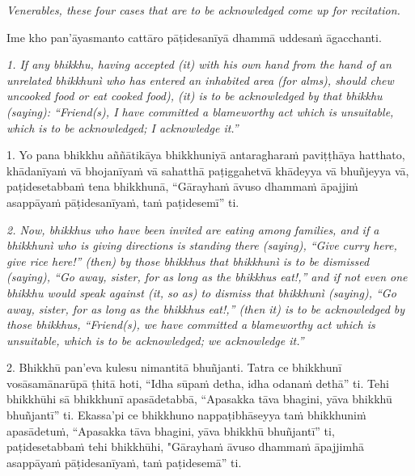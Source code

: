 \documentclass[11pt]{article}
\newcommand{\EnglishColumn}[1]{\itshape\footnotesize{#1}}
\begin{document}
\begin{paracol}{2}
\begin{column}
{\EnglishColumn
Venerables, these four cases that are to be acknowledged come up for recitation.
}
\switchcolumn

\begin{flushleft}
Ime kho pan’āyasmanto cattāro pāṭidesanīyā dhammā uddesaṁ āgacchanti.
\switchcolumn*
\end{flushleft}

{\EnglishColumn
1. If any bhikkhu, having accepted (it) with his own hand from the hand of an unrelated bhikkhunì who has entered an inhabited area (for alms), should chew uncooked food or eat cooked food), (it) is to be acknowledged by that bhikkhu (saying): “Friend(s), I have committed a blameworthy act which is unsuitable, which is to be acknowledged; I acknowledge it.”
}
\switchcolumn

\begin{flushleft}
1. Yo pana bhikkhu aññātikāya bhikkhuniyā antaragharaṁ paviṭṭhāya hatthato, khādanīyaṁ vā bhojanīyaṁ vā sahatthā paṭiggahetvā khādeyya vā bhuñjeyya vā, paṭidesetabbaṁ tena bhikkhunā, “Gārayhaṁ āvuso dhammaṁ āpajjiṁ asappāyaṁ pāṭidesanīyaṁ, taṁ paṭidesemī” ti.
\switchcolumn*
\end{flushleft}

{\EnglishColumn
2. Now, bhikkhus who have been invited are eating among families, and if a bhikkhunì who is giving directions is standing there (saying), “Give curry here, give rice here!” (then) by those bhikkhus that bhikkhunì is to be dismissed (saying), “Go away, sister, for as long as the bhikkhus eat!,” and if not even one bhikkhu would speak against (it, so as) to dismiss that bhikkhunì (saying), “Go away, sister, for as long as the bhikkhus eat!,” (then it) is to be acknowledged by those bhikkhus, “Friend(s), we have committed a blameworthy act which is unsuitable, which is to be acknowledged; we acknowledge it.”
}
\switchcolumn

\begin{flushleft}
2. Bhikkhū pan’eva kulesu nimantitā bhuñjanti. Tatra ce bhikkhunī vosāsamānarūpā ṭhitā hoti, “Idha sūpaṁ detha, idha odanaṁ dethā” ti. Tehi bhikkhūhi sā bhikkhunī apasādetabbā, “Apasakka tāva bhagini, yāva bhikkhū bhuñjantī” ti. Ekassa’pi ce bhikkhuno nappaṭibhāseyya taṁ bhikkhuniṁ apasādetuṁ, “Apasakka tāva bhagini, yāva bhikkhū bhuñjantī” ti, paṭidesetabbaṁ tehi bhikkhūhi, "Gārayhaṁ āvuso dhammaṁ āpajjimhā asappāyaṁ pāṭidesanīyaṁ, taṁ paṭidesemā” ti.
\switchcolumn*
\end{flushleft}


\end{column}
\end{paracol}
\end{document}
